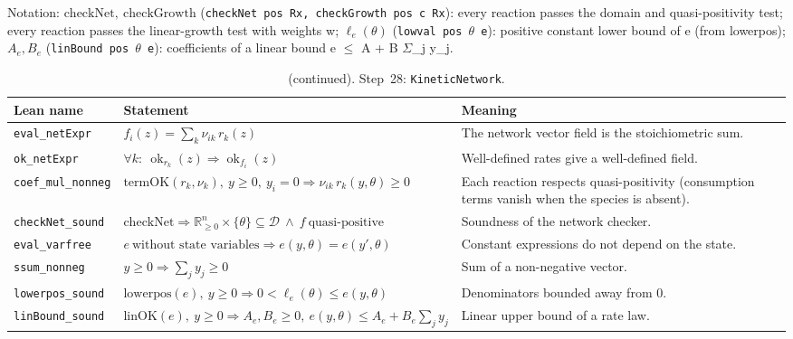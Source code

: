 {\small\raggedright Notation: $\mathrm{checkNet},\ \mathrm{checkGrowth}$ (\texttt{checkNet pos Rx, checkGrowth pos c Rx}): every reaction passes the domain and quasi-positivity test; every reaction passes the linear-growth test with weights w; $\ell_e(\theta)$ (\texttt{lowval pos $\theta$ e}): positive constant lower bound of e (from lowerpos); $A_e,B_e$ (\texttt{linBound pos $\theta$ e}): coefficients of a linear bound e $\le$ A + B $\Sigma$\_j y\_j.}

\addtocounter{table}{-1}
{\small
\begin{longtable}{@{}>{\raggedright\arraybackslash}p{3.6cm}>{\raggedright\arraybackslash}p{6.6cm}>{\raggedright\arraybackslash}p{5.6cm}@{}}
\caption[]{(continued). Step~28: \texttt{KineticNetwork}.}\\
\toprule
Lean name & Statement & Meaning \\
\midrule
\endhead
\texttt{eval\_\allowbreak{}netExpr} & $\displaystyle f_i(z)=\sum_k\nu_{ik}\,r_k(z)$ & The network vector field is the stoichiometric sum. \\[3pt]
\texttt{ok\_\allowbreak{}netExpr} & $\displaystyle \forall k:\ \operatorname{ok}_{r_k}(z)\Rightarrow\operatorname{ok}_{f_i}(z)$ & Well-defined rates give a well-defined field. \\[3pt]
\texttt{coef\_\allowbreak{}mul\_\allowbreak{}nonneg} & $\displaystyle \mathrm{termOK}(r_k,\nu_k),\ y\ge0,\ y_i=0\Rightarrow\nu_{ik}\,r_k(y,\theta)\ge0$ & Each reaction respects quasi-positivity (consumption terms vanish when the species is absent). \\[3pt]
\texttt{checkNet\_\allowbreak{}sound} & $\displaystyle \mathrm{checkNet}\Rightarrow\mathbb{R}^n_{\ge0}\times\{\theta\}\subseteq\mathcal D\ \wedge\ f\ \text{quasi-positive}$ & Soundness of the network checker. \\[3pt]
\texttt{eval\_\allowbreak{}varfree} & $\displaystyle e\ \text{without state variables}\Rightarrow e(y,\theta)=e(y',\theta)$ & Constant expressions do not depend on the state. \\[3pt]
\texttt{ssum\_\allowbreak{}nonneg} & $\displaystyle y\ge0\Rightarrow\sum_jy_j\ge0$ & Sum of a non-negative vector. \\[3pt]
\texttt{lowerpos\_\allowbreak{}sound} & $\displaystyle \mathrm{lowerpos}(e),\ y\ge0\Rightarrow0<\ell_e(\theta)\le e(y,\theta)$ & Denominators bounded away from 0. \\[3pt]
\texttt{linBound\_\allowbreak{}sound} & $\displaystyle \mathrm{linOK}(e),\ y\ge0\Rightarrow A_e,B_e\ge0,\ e(y,\theta)\le A_e+B_e\sum_jy_j$ & Linear upper bound of a rate law. \\[3pt]

\end{longtable}}
